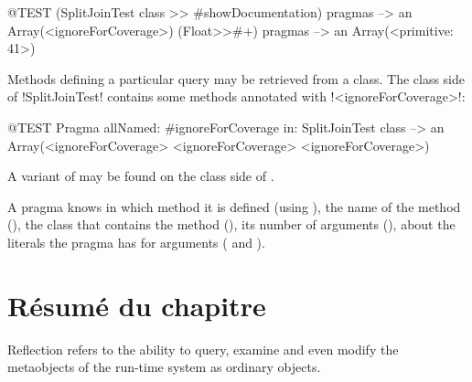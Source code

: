 \documentclass[a4paper,10pt,twoside]{book}
\begin{document}
\begin{code}{@TEST}
(SplitJoinTest class >> #showDocumentation) pragmas
  --> an Array(<ignoreForCoverage>)
(Float>>#+) pragmas --> an Array(<primitive: 41>)
\end{code}

Methods defining a particular query may be retrieved from a class. The class side of \ct!SplitJoinTest! contains some methods annotated with \ct!<ignoreForCoverage>!:

\begin{code}{@TEST}
Pragma allNamed: #ignoreForCoverage in: SplitJoinTest class  --> an Array(<ignoreForCoverage> <ignoreForCoverage> <ignoreForCoverage>)
\end{code}

A variant of  may be found on the class side of .

A pragma knows in which method it is defined (using ), the name of the method (), the class that contains the method (), its number of arguments (), about the literals the pragma has for arguments ( and ). 


\section{Résumé du chapitre}

Reflection refers to the ability to query, examine and even modify the metaobjects of the run-time system as ordinary objects.
\end{document}
